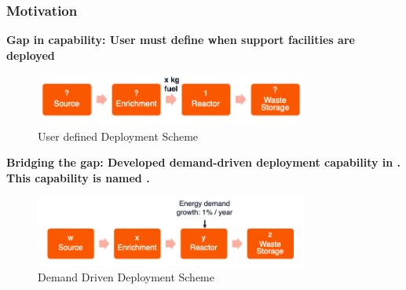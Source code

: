 %

  \begin{frame}
    \frametitle{Motivation}

    \textbf{Gap in capability: User must define when support facilities are deployed}

    \begin{figure}[htbp!]
      \begin{center}
        \includegraphics[width=0.8\textwidth]{images/user-deploy}
      \end{center}
            \caption{User defined Deployment Scheme }
    \end{figure}

    \textbf{Bridging the gap: Developed demand-driven deployment capability in \Cyclus. This capability is named \deploy.}

    \begin{figure}[htbp!]
      \begin{center}
        \includegraphics[width=0.8\textwidth]{images/auto-deploy}
      \end{center}
            \caption{Demand Driven Deployment Scheme}
    \end{figure}

  \end{frame}
